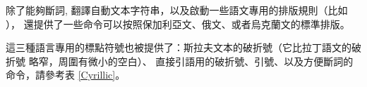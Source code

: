 除了能夠斷詞,
翻譯自動文本字符串，以及啟動一些語文專用的排版規則（比如 ），
 還提供了一些命令可以按照保加利亞文、俄文、或者烏克蘭文的標準排版。


這三種語言專用的標點符號也被提供了：斯拉夫文本的破折號（它比拉丁語文的破折號
略窄，周圍有微小的空白）、
直接引語用的破折號、引號、以及方便斷詞的命令，請參考表 \ref{Cyrillic}。

